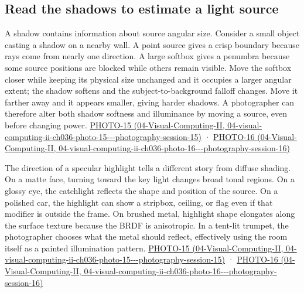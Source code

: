 \subsection{Read the shadows to estimate a light source}\label{03-visual-computing-i-ch004-read-the-shadows-to-estimate-a-light-source}

A shadow contains information about source angular size. Consider a small object casting a shadow on a nearby wall. A point source gives a crisp boundary because rays come from nearly one direction. A large softbox gives a penumbra because some source positions are blocked while others remain visible. Move the softbox closer while keeping its physical size unchanged and it occupies a larger angular extent; the shadow softens and the subject-to-background falloff changes. Move it farther away and it appears smaller, giving harder shadows. A photographer can therefore alter both shadow softness and illuminance by moving a source, even before changing power. \href{../04-Visual-Computing-II/main.pdf\#nameddest=04-visual-computing-ii-ch036-photo-15---photography-session-15}{PHOTO-15 (04-Visual-Computing-II, 04-visual-computing-ii-ch036-photo-15-\/-\/-photography-session-15)} · \href{../04-Visual-Computing-II/main.pdf\#nameddest=04-visual-computing-ii-ch036-photo-16---photography-session-16}{PHOTO-16 (04-Visual-Computing-II, 04-visual-computing-ii-ch036-photo-16-\/-\/-photography-session-16)}

The direction of a specular highlight tells a different story from diffuse shading. On a matte face, turning toward the key light changes broad tonal regions. On a glossy eye, the catchlight reflects the shape and position of the source. On a polished car, the highlight can show a stripbox, ceiling, or flag even if that modifier is outside the frame. On brushed metal, highlight shape elongates along the surface texture because the BRDF is anisotropic. In a tent-lit trumpet, the photographer chooses what the metal should reflect, effectively using the room itself as a painted illumination pattern. \href{../04-Visual-Computing-II/main.pdf\#nameddest=04-visual-computing-ii-ch036-photo-15---photography-session-15}{PHOTO-15 (04-Visual-Computing-II, 04-visual-computing-ii-ch036-photo-15-\/-\/-photography-session-15)} · \href{../04-Visual-Computing-II/main.pdf\#nameddest=04-visual-computing-ii-ch036-photo-16---photography-session-16}{PHOTO-16 (04-Visual-Computing-II, 04-visual-computing-ii-ch036-photo-16-\/-\/-photography-session-16)}

